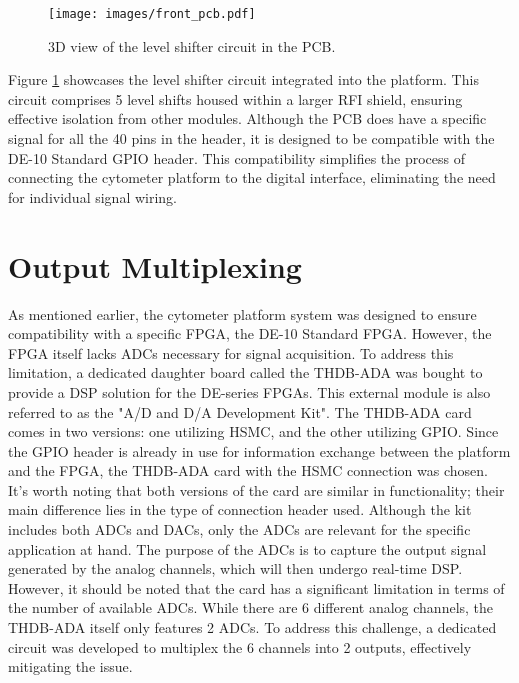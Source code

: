 \begin{figure}[!ht]
    \centering
    \texttt{[image: images/front\_pcb.pdf]}
    \caption{3D view of the level shifter circuit in the PCB.}
    \label{figure:level-shifters-pcb}
\end{figure}

Figure \ref{figure:level-shifters-pcb} showcases the level shifter circuit integrated into the platform. This circuit comprises 5 level shifts housed within a larger \ac{RFI} shield, ensuring effective isolation from other modules. Although the \ac{PCB} does have a specific signal for all the 40 pins in the header, it is designed to be compatible with the DE-10 Standard \ac{GPIO} header. This compatibility simplifies the process of connecting the cytometer platform to the digital interface, eliminating the need for individual signal wiring.

\section{Output Multiplexing}
\label{chapter:fe-mux}

As mentioned earlier, the cytometer platform system was designed to ensure compatibility with a specific \ac{FPGA}, the DE-10 Standard \ac{FPGA}. However, the \ac{FPGA} itself lacks \ac{ADC}s necessary for signal acquisition. To address this limitation, a dedicated daughter board called the THDB-ADA was bought to provide a \ac{DSP} solution for the DE-series \ac{FPGA}s. This external module is also referred to as the "A/D and D/A Development Kit". The THDB-ADA card comes in two versions: one utilizing \ac{HSMC}, and the other utilizing \ac{GPIO}. Since the \ac{GPIO} header is already in use for information exchange between the platform and the \ac{FPGA}, the THDB-ADA card with the \ac{HSMC} connection was chosen. It's worth noting that both versions of the card are similar in functionality; their main difference lies in the type of connection header used. Although the kit includes both \ac{ADC}s and \ac{DAC}s, only the \ac{ADC}s are relevant for the specific application at hand. The purpose of the \ac{ADC}s is to capture the output signal generated by the analog channels, which will then undergo real-time \ac{DSP}. However, it should be noted that the card has a significant limitation in terms of the number of available \ac{ADC}s. While there are 6 different analog channels, the THDB-ADA itself only features 2 \ac{ADC}s. To address this challenge, a dedicated circuit was developed to multiplex the 6 channels into 2 outputs, effectively mitigating the issue.

